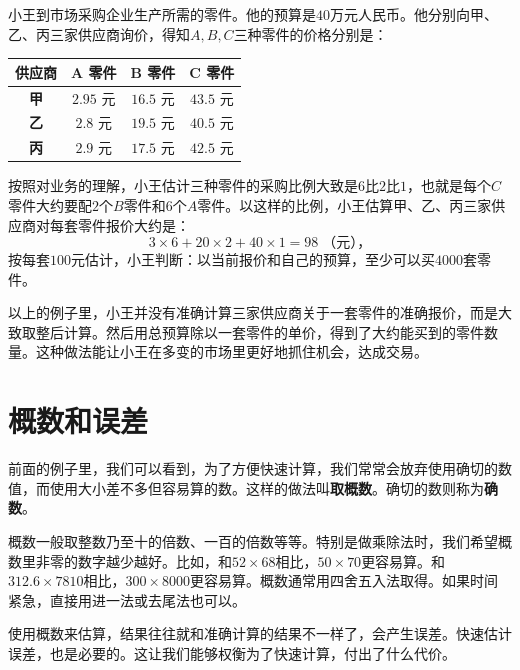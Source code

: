 \documentclass[12pt,UTF8]{ctexbook}
\begin{document}
\begin{ex}
    小王到市场采购企业生产所需的零件。他的预算是$40$万元人民币。他分别向甲、乙、丙三家供应商询价，得知$A,B,C$三种零件的价格分别是：
    \begin{table}[htbp]
        \centering
        \label{tab:报价表}
        \begin{tabular}{|c|c|c|c|}
            \hline
            \textbf{供应商} & \textbf{A 零件} & \textbf{B 零件} & \textbf{C 零件} \\
            \hline
            \textbf{甲} & $2.95$ 元 & $16.5$ 元 & $43.5$ 元 \\
            \hline
            \textbf{乙} & $2.8$ 元 & $19.5$ 元 & $40.5$ 元 \\
            \hline
            \textbf{丙} & $2.9$ 元 & $17.5$ 元 & $42.5$ 元 \\
            \hline
        \end{tabular}
    \end{table}

    按照对业务的理解，小王估计三种零件的采购比例大致是$6$比$2$比$1$，也就是每个$C$零件大约要配$2$个$B$零件和$6$个$A$零件。以这样的比例，小王估算甲、乙、丙三家供应商对每套零件报价大约是：
    $$ 3\times 6 + 20 \times 2 + 40\times 1 = 98 \;\mbox{（元），} $$
    按每套$100$元估计，小王判断：以当前报价和自己的预算，至少可以买$4000$套零件。
\end{ex}

以上的例子里，小王并没有准确计算三家供应商关于一套零件的准确报价，而是大致取整后计算。然后用总预算除以一套零件的单价，得到了大约能买到的零件数量。这种做法能让小王在多变的市场里更好地抓住机会，达成交易。

\section{概数和误差}

前面的例子里，我们可以看到，为了方便快速计算，我们常常会放弃使用确切的数值，而使用大小差不多但容易算的数。这样的做法叫\textbf{取概数}。确切的数则称为\textbf{确数}。

概数一般取整数乃至十的倍数、一百的倍数等等。特别是做乘除法时，我们希望概数里非零的数字越少越好。比如，和$52 \times 68$相比，$50\times 70$更容易算。和$312.6 \times 7810$相比，$300 \times 8000$更容易算。概数通常用四舍五入法取得。如果时间紧急，直接用进一法或去尾法也可以。

使用概数来估算，结果往往就和准确计算的结果不一样了，会产生误差。快速估计误差，也是必要的。这让我们能够权衡为了快速计算，付出了什么代价。
\end{document}

